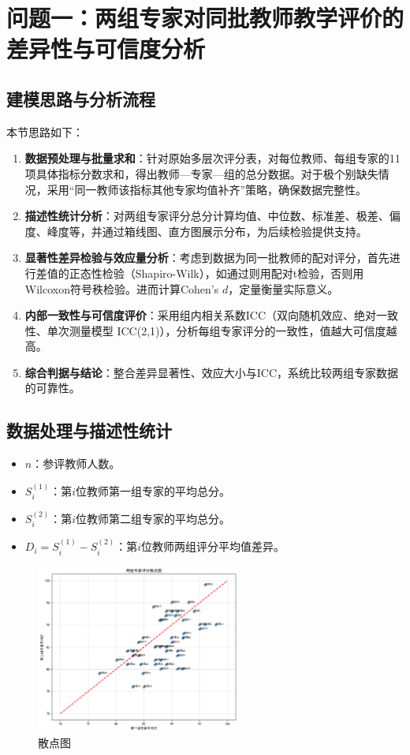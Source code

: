 \section{问题一：两组专家对同批教师教学评价的差异性与可信度分析}


\subsection{建模思路与分析流程}
本节思路如下：

\begin{enumerate}
    \item \textbf{数据预处理与批量求和}：针对原始多层次评分表，对每位教师、每组专家的11项具体指标分数求和，得出教师—专家—组的总分数据。对于极个别缺失情况，采用“同一教师该指标其他专家均值补齐”策略，确保数据完整性。
    \item \textbf{描述性统计分析}：对两组专家评分总分计算均值、中位数、标准差、极差、偏度、峰度等，并通过箱线图、直方图展示分布，为后续检验提供支持。
    \item \textbf{显著性差异检验与效应量分析}：考虑到数据为同一批教师的配对评分，首先进行差值的正态性检验（Shapiro-Wilk），如通过则用配对t检验，否则用Wilcoxon符号秩检验。进而计算Cohen's $d$，定量衡量实际意义。
    \item \textbf{内部一致性与可信度评价}：采用组内相关系数ICC（双向随机效应、绝对一致性、单次测量模型 ICC(2,1)），分析每组专家评分的一致性，值越大可信度越高。
    \item \textbf{综合判据与结论}：整合差异显著性、效应大小与ICC，系统比较两组专家数据的可靠性。
\end{enumerate}

\subsection{数据处理与描述性统计}


\begin{itemize}
    \item $n$：参评教师人数。
    \item $S^{(1)}_i$：第$i$位教师第一组专家的平均总分。
    \item $S^{(2)}_i$：第$i$位教师第二组专家的平均总分。
    \item $D_i = S^{(1)}_i - S^{(2)}_i$：第$i$位教师两组评分平均值差异。
\end{itemize}

\begin{figure}[htbp]
    \centering
    \includegraphics[width=0.6\textwidth]{scores_scatter.png} %
    \caption{散点图}
\end{figure}


